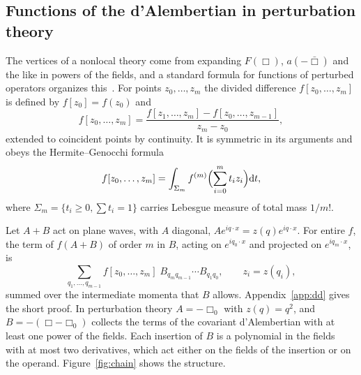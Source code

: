 \documentclass[aps,prd,10pt,twocolumn,superscriptaddress,nofootinbib,floatfix,longbibliography]{revtex4-2}
\newcommand{\dd}{\mathrm{d}}
\begin{document}
\subsection{Functions of the d'Alembertian in perturbation theory}
\label{sec:DK}

The vertices of a nonlocal theory come from expanding $F(\Box)$, $a(-\bar\Box)$ and the like in powers of the fields, and a standard formula for functions of perturbed operators organizes this~\cite{DaletskiiKrein1965}. For points $z_0,\dots,z_m$ the divided difference $f[z_0,\dots,z_m]$ is defined by $f[z_0]=f(z_0)$ and
\[
f[z_0,\dots,z_m]=\frac{f[z_1,\dots,z_m]-f[z_0,\dots,z_{m-1}]}{z_m-z_0},
\]
extended to coincident points by continuity. It is symmetric in its arguments and obeys the Hermite--Genocchi formula~\cite{deBoor2005}
\begin{equation}
\label{eq:HG}
f[z_0,\dots,z_m]=\int_{\Sigma_m}f^{(m)}\Bigl(\sum_{i=0}^m t_iz_i\Bigr)\dd t,
\end{equation}
where $\Sigma_m=\{t_i\ge0,\sum t_i=1\}$ carries Lebesgue measure of total mass $1/m!$.

Let $A+B$ act on plane waves, with $A$ diagonal, $Ae^{iq\cdot x}=z(q)e^{iq\cdot x}$. For entire $f$, the term of $f(A+B)$ of order $m$ in $B$, acting on $e^{iq_0\cdot x}$ and projected on $e^{iq_m\cdot x}$, is
\begin{equation}
\label{eq:DK}
\sum_{q_1,\dots,q_{m-1}}f[z_0,\dots,z_m]\;B_{q_mq_{m-1}}\cdots B_{q_1q_0},\qquad z_i=z(q_i),
\end{equation}
summed over the intermediate momenta that $B$ allows. Appendix~\ref{app:dd} gives the short proof. In perturbation theory $A=-\Box_0$ with $z(q)=q^2$, and $B=-(\Box-\Box_0)$ collects the terms of the covariant d'Alembertian with at least one power of the fields. Each insertion of $B$ is a polynomial in the fields with at most two derivatives, which act either on the fields of the insertion or on the operand. Figure~\ref{fig:chain} shows the structure.
\end{document}
